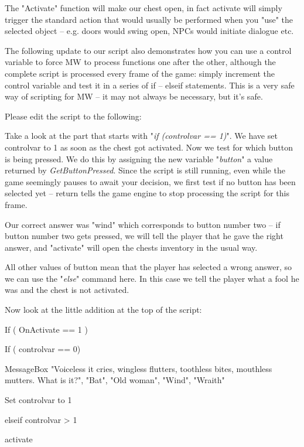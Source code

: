 The "Activate" function will make our chest open, in fact activate will simply trigger the standard action that would usually be performed when you "use" the selected object -- e.g. doors would swing open, NPCs would initiate dialogue etc.

The following update to our script also demonstrates how you can use a control variable to force MW to process functions one after the other, although the complete script is processed every frame of the game: simply increment the control variable and test it in a series of if -- elseif statements. This is a very safe way of scripting for MW -- it may not always be necessary, but it's safe.

Please edit the script to the following:



Take a look at the part that starts with "\emph{if (controlvar == 1)}". We have set controlvar to 1 as soon as the chest got activated. Now we test for which button is being pressed. We do this by assigning the new variable "\emph{button}" a value returned by \emph{GetButtonPressed}. Since the script is still running, even while the game seemingly pauses to await your decision, we first test if no button has been selected yet -- return tells the game engine to stop processing the script for this frame.

Our correct answer was "wind" which corresponds to button number two -- if button number two gets pressed, we will tell the player that he gave the right answer, and "activate" will open the chests inventory in the usual way.

All other values of button mean that the player has selected a wrong answer, so we can use the "\emph{else}" command here. In this case we tell the player what a fool he was and the chest is not activated.

Now look at the little addition at the top of the script:


If ( OnActivate == 1 )

If ( controlvar == 0)

MessageBox "Voiceless it cries, wingless flutters, toothless bites,
mouthless mutters. What is it?", "Bat", "Old woman", "Wind", "Wraith"

Set controlvar to 1

elseif controlvar \textgreater{} 1

activate

